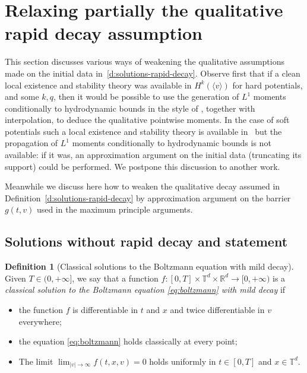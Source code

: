 \documentclass[11pt]{article}
\newcommand{\Subsection}{\subsection}
\theoremstyle{plain}
\theoremstyle{definition}
\newtheorem{defn}[thm]{Definition}
\numberwithin{equation}{section}
\newcommand{\R}{\mathbb R}
\begin{document}
\section{Relaxing partially the qualitative rapid decay assumption}
\label{s:no-decay}

This section discusses various ways of weakening the qualitative
assumptions made on the initial data
in~\ref{d:solutions-rapid-decay}. Observe first that if a clean local
existence and stability theory was available in
$H^{k}(\langle v \rangle)$ for hard potentials, and some $k,q$, then
it would be possible to use the generation of $L^1$ moments
conditionally to hydrodynamic bounds in the style of
\cite[\S 5.3.1]{GMM}, together with interpolation, to deduce
the qualitative pointwise moments. In the case of soft potentials such
a local existence and stability theory is available
in~\cite{MR3376931} but the propagation of $L^1$ moments conditionally
to hydrodynamic bounds is not available: if it was, an approximation
argument on the initial data (truncating its support) could be
performed. We postpone this discussion to another work.

Meanwhile we discuss here how to weaken the qualitative decay assumed
in Definition~\ref{d:solutions-rapid-decay} by approximation argument
on the barrier $g(t,v)$ used in the maximum principle arguments.

\Subsection{Solutions without rapid decay and statement}

\begin{defn}[Classical solutions to the Boltzmann equation with mild
decay] \label{d:solutions-no-decay} Given $T \in (0,+\infty]$, we
say that a function
$f : [0,T] \times \mathbb T^d \times \R^d \to [0,+\infty)$ is a
\emph{classical solution to the Boltzmann equation
\eqref{eq:boltzmann} with mild decay} if
\begin{itemize}
\item the function $f$ is differentiable in $t$ and $x$ and twice
differentiable in $v$ everywhere;
\item the equation \eqref{eq:boltzmann} holds classically at every
point;
\item The limit $\lim_{|v| \to \infty} f(t,x,v) = 0$ holds uniformly
in $t \in [0,T]$ and $x \in \mathbb{T}^d$.
\end{itemize}
\end{defn}
\end{document}
